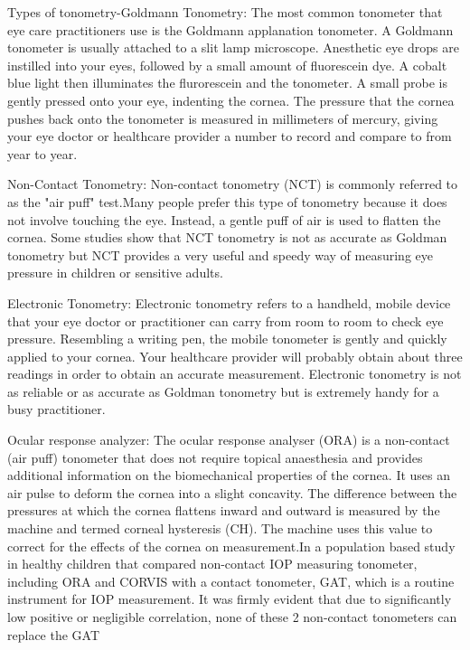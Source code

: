 \documentclass[12pt,A4paper]{article}
\begin{document}
Types of tonometry-Goldmann Tonometry:
The most common tonometer that eye care practitioners use is the Goldmann applanation tonometer. A Goldmann tonometer is usually attached to a slit lamp microscope. Anesthetic eye drops are instilled into your eyes, followed by a small amount of fluorescein dye. A cobalt blue light then illuminates the flurorescein and the tonometer. A small probe is gently pressed onto your eye, indenting the cornea. The pressure that the cornea pushes back onto the tonometer is measured in millimeters of mercury, giving your eye doctor or healthcare provider a number to record and compare to from year to year.

Non-Contact Tonometry:
Non-contact tonometry (NCT) is commonly referred to as the "air puff" test.Many people prefer this type of tonometry because it does not involve touching the eye. Instead, a gentle puff of air is used to flatten the cornea. Some studies show that NCT tonometry is not as accurate as Goldman tonometry but NCT provides a very useful and speedy way of measuring eye pressure in children or sensitive adults.

Electronic Tonometry:
Electronic tonometry refers to a handheld, mobile device that your eye doctor or practitioner can carry from room to room to check eye pressure. Resembling a writing pen, the mobile tonometer is gently and quickly applied to your cornea. Your healthcare provider will probably obtain about three readings in order to obtain an accurate measurement. Electronic tonometry is not as reliable or as accurate as Goldman tonometry but is extremely handy for a busy practitioner.

Ocular response analyzer:
The ocular response analyser (ORA) is a non-contact (air puff) tonometer that does not require topical anaesthesia and provides additional information on the biomechanical properties of the cornea. It uses an air pulse to deform the cornea into a slight concavity. The difference between the pressures at which the cornea flattens inward and outward is measured by the machine and termed corneal hysteresis (CH). The machine uses this value to correct for the effects of the cornea on measurement.In a population based study in healthy children that compared non-contact IOP measuring tonometer, including ORA and CORVIS with a contact tonometer, GAT, which is a routine instrument for IOP measurement. It was firmly evident that due to significantly low positive or negligible correlation, none of these 2 non-contact tonometers can replace the GAT
\end{document}
